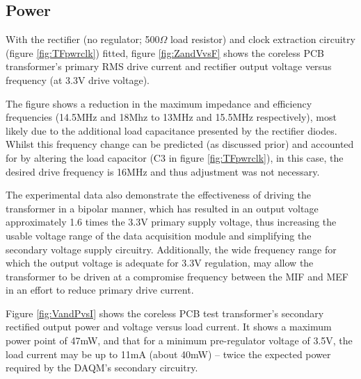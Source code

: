 \documentclass[conference]{IEEEtran}
\begin{document}

	\subsection{Power}
	With the rectifier (no regulator; 500$\Omega$ load resistor) and clock extraction circuitry (figure \ref{fig:TFpwrclk}) fitted, figure \ref{fig:ZandVvsF} shows the coreless PCB transformer's primary RMS drive current and rectifier output voltage versus frequency (at 3.3V drive voltage).
	
	The figure shows a reduction in the maximum impedance and efficiency frequencies (14.5MHz and 18Mhz to 13MHz and 15.5MHz respectively), most likely due to the additional load capacitance presented by the rectifier diodes.  Whilst this frequency change can be predicted (as discussed prior) and accounted for by altering the load capacitor (C3 in figure \ref{fig:TFpwrclk}), in this case, the desired drive frequency is 16MHz and thus adjustment was not necessary.
	
	The experimental data also demonstrate the effectiveness of driving the transformer in a bipolar manner, which has resulted in an output voltage approximately 1.6 times the 3.3V primary supply voltage, thus increasing the usable voltage range of the data acquisition module and simplifying the secondary voltage supply circuitry.  Additionally, the wide frequency range for which the output voltage is adequate for 3.3V regulation, may allow the transformer to be driven at a compromise frequency between the MIF and MEF in an effort to reduce primary drive current.
	
	Figure \ref{fig:VandPvsI} shows the coreless PCB test transformer's secondary rectified output power and voltage versus load current.  It shows a maximum power point of 47mW, and that for a minimum pre-regulator voltage of 3.5V, the load current may be up to 11mA (about 40mW) -- twice the expected power required by the DAQM's secondary circuitry.
	
\end{document}

